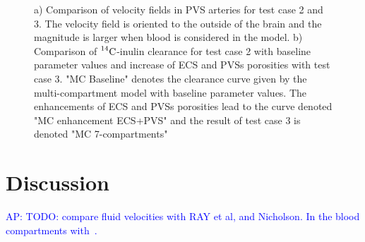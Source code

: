\documentclass[10pt]{article}
\newcommand{\AP}[1]{\textcolor{blue}{AP: #1}}
\newcommand{\1}{^{(1)}}
\newcommand{\2}{^{(2)}}
\newcommand{\Cinulin}{$\prescript{14}{}{\text{C}}$-inulin }
\newcommand{\commentout}[1]{}
\begin{document}
\commentout{
\begin{figure}[htbp]
         \centering
        \caption{Comparison of \Cinulin clearance for test case 2 with baseline parameter values and increse of ECS and PVSs porosities with test case 3. "MC Baseline" denotes the  clearance curve given by the multi-compartment model with baseline parameter values. The enhancements of ECS and PVSs porosities lead to the curve denoted "MC enhancement ECS+PVS" and the result of test case 3 is denoted "MC 7 compartements"}
        \label{fig:compare-blood}
\end{figure}
}

\begin{figure}
    \centering
    \caption{a) Comparison of velocity fields in PVS arteries for test case 2 and 3. The velocity field is oriented to the outside of the brain and the magnitude is larger when blood is considered in the model. b) Comparison of \Cinulin clearance for test case 2 with baseline parameter values and increase of ECS and PVSs porosities with test case 3. "MC Baseline" denotes the  clearance curve given by the multi-compartment model with baseline parameter values. The enhancements of ECS and PVSs porosities lead to the curve denoted "MC enhancement ECS+PVS" and the result of test case 3 is denoted "MC 7-compartments"}
    \label{fig:blood}
\end{figure}





\section{Discussion}
\label{sec:discussion}

\AP{TODO: compare fluid velocities with RAY et al, and Nicholson. In the blood compartments with~\cite{UNEKAWA201069}.}
\end{document}
